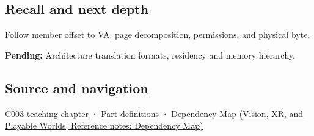 \subsection{Recall and next depth}\label{appendix-18ee4f913c3c-recall-and-next-depth}

Follow member offset to VA, page decomposition, permissions, and physical byte.

\textbf{Pending:} Architecture translation formats, residency and memory hierarchy.

\subsection{Source and navigation}\label{appendix-18ee4f913c3c-source-and-navigation}

\hyperref[01-foundations-i-ch002-where-the-bytes-live]{C003 teaching chapter} · \hyperref[appendix-fd090d982a15-m003---parts-41-60]{Part definitions} · \href{../07-Vision-XR-and-Playable-Worlds/main.pdf\#nameddest=appendix-4ad47bdd269a}{Dependency Map (Vision, XR, and Playable Worlds, Reference notes: Dependency Map)}
